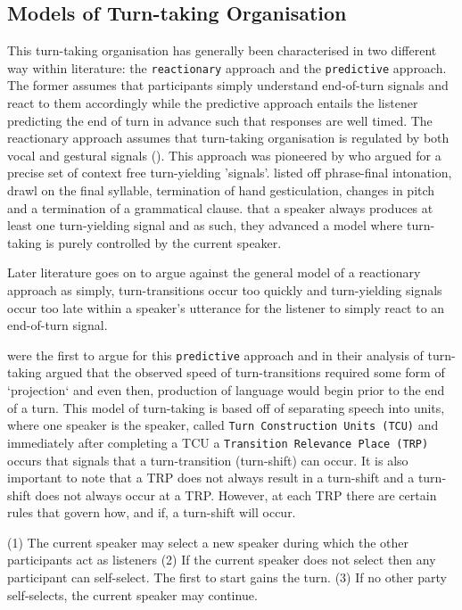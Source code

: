 \documentclass[logo,bsc,singlespacing,parskip]{infthesis}
\begin{document}
\subsection{Models of Turn-taking Organisation} 
This turn-taking organisation has generally been characterised in two different way within literature: the \texttt{reactionary} approach and the \texttt{predictive} approach.
The former assumes that participants simply understand end-of-turn signals and react to them accordingly while the predictive approach entails the listener predicting the end of turn in advance such that responses are well timed. The reactionary approach assumes that turn-taking organisation is regulated by both vocal and gestural signals (\cite{Yngve1970}). This approach was pioneered by \cite{Duncan1972, Duncan1973, Duncan1974, Duncan1977} who argued for a precise set of context free turn-yielding 'signals'. \cite{Duncan1972} listed off phrase-final intonation, drawl on the final syllable, termination of hand gesticulation, changes in pitch and a termination of a grammatical clause. \cite{Duncan1977} that a speaker always produces at least one turn-yielding signal and as such, they advanced a model where turn-taking is purely controlled by the current speaker. 

Later literature goes on to argue against the general model of a reactionary approach as simply, turn-transitions occur too quickly and turn-yielding signals occur too late within a speaker's utterance for the listener to simply react to an end-of-turn signal. 

\cite{Sacks1974} were the first to argue for this \texttt{predictive} approach and in their analysis of turn-taking argued that the observed speed of turn-transitions required some form of `projection` and even then, production of language would begin prior to the end of a turn. This model of turn-taking is based off of separating speech into units, where one speaker is the speaker, called \texttt{Turn Construction Units (TCU)} and immediately after completing a TCU a \texttt{Transition Relevance Place (TRP)} occurs that signals that a turn-transition (turn-shift) can occur. It is also important to note that a TRP does not always result in a turn-shift and a turn-shift does not always occur at a TRP. However, at each TRP there are certain rules that govern how, and if, a turn-shift will occur. 

(1) The current speaker may select a new speaker during which the other participants act as listeners 
(2) If the current speaker does not select then any participant can self-select. The first to start gains the turn.
(3) If no other party self-selects, the current speaker may continue. 
\end{document}
